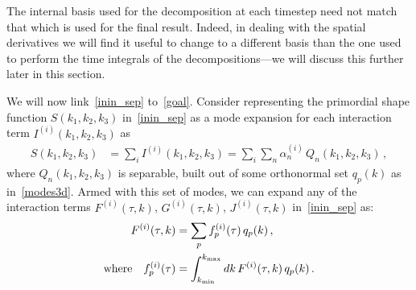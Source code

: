 The internal basis used for the decomposition at each timestep need not match that
which is used for the final result.
Indeed, in dealing with the spatial derivatives we will find it useful to change
to a different basis than the one used to perform the time integrals of the
decompositions---we will discuss this further later in this section.


We will now link~\eqref{inin_sep} to~\eqref{goal}.
Consider representing the primordial shape function $S(k_1, k_2, k_3)$ in~\eqref{inin_sep} as
a mode expansion for each interaction term $I^{(i)}(k_1, k_2,k_3)$ as
\begin{align}\label{modeexp}
S(k_1, k_2,k_3) &= \sum_i I^{(i)}(k_1,k_2,k_3) =  \sum_i \sum_n \alpha_n^{(i)}  \, Q_n(k_1,k_2,k_3)\,,
\end{align}
where $Q_n(k_1,k_2,k_3)$ is separable, built out of some
orthonormal set $q_p(k)$ as in~\eqref{modes3d}.
Armed with this set of modes,
we can expand any of the interaction terms $F^{(i)}(\tau, k)$, $G^{(i)}(\tau, k)$, $J^{(i)}(\tau, k)$
in~\eqref{inin_sep} as:
\begin{align}
    F^{(i)}(\tau, k) &= \sum _p f_p^{(i)} (\tau) \, q_p(k)\,,\label{mode1Dcoeffs_sum}\\
    \text{where} \quad f_p^{(i)} (\tau)  &= \int _{k_\text{min}}^{k_\text{max}} dk \,F^{(i)}(\tau, k) \, q_p(k) \,.\label{mode1Dcoeffs_integral}
\end{align}



